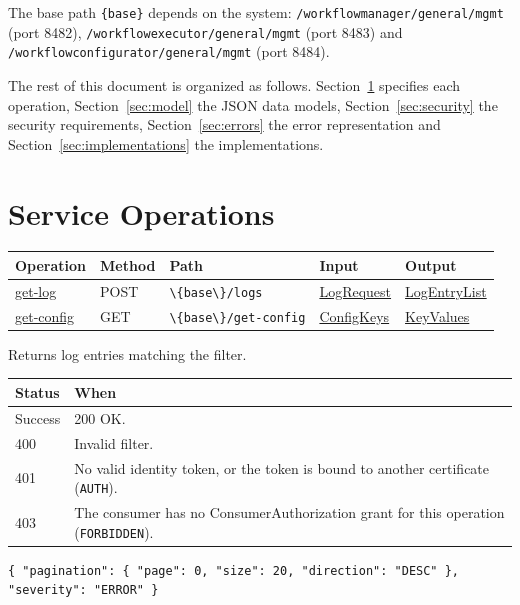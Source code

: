 \documentclass[a4paper]{arrowhead}
\newcommand{\mref}[1]{{\textcolor{ArrowheadPurple}{\hyperref[sec:model:#1]{#1}}}}
\newcommand{\oref}[1]{{\textcolor{ArrowheadBlue}{\hyperref[sec:operations:#1]{#1}}}}
\begin{document}
The base path \texttt{\{base\}} depends on the system: \texttt{/workflowmanager/general/mgmt} (port 8482),
\texttt{/workflowexecutor/general/mgmt} (port 8483) and \texttt{/workflowconfigurator/general/mgmt} (port 8484).

The rest of this document is organized as follows. Section~\ref{sec:operations} specifies each operation,
Section~\ref{sec:model} the JSON data models, Section~\ref{sec:security} the security requirements,
Section~\ref{sec:errors} the error representation and Section~\ref{sec:implementations} the implementations.

\newpage
\section{Service Operations}
\label{sec:operations}

{\small
\begin{longtable}{|p{3.0cm}|p{1.5cm}|p{5.3cm}|p{3.0cm}|p{3.0cm}|}

\hline
\rowcolor{gray!33} Operation & Method & Path & Input & Output \\ \hline
\endhead
\oref{get-log} & POST & \texttt{\textbackslash{}\{base\textbackslash{}\}/\allowbreak{}logs} & \mref{LogRequest} & \mref{LogEntryList} \\ \hline
\oref{get-config} & GET & \texttt{\textbackslash{}\{base\textbackslash{}\}/\allowbreak{}get-\allowbreak{}config} & \mref{ConfigKeys} & \mref{KeyValues} \\ \hline
\end{longtable}
}

Returns log entries matching the filter.

{\small
\begin{longtable}{|p{2.0cm}|p{13.8cm}|}

\hline
\rowcolor{gray!33} Status & When \\ \hline
\endhead
Success & 200 OK. \\ \hline
400 & Invalid filter. \\ \hline
401 & No valid identity token, or the token is bound to another certificate (\texttt{AUTH}). \\ \hline
403 & The consumer has no ConsumerAuthorization grant for this operation (\texttt{FORBIDDEN}). \\ \hline
\end{longtable}
}


\begin{lstlisting}[caption={Example request body}]
{ "pagination": { "page": 0, "size": 20, "direction": "DESC" }, "severity": "ERROR" }
\end{lstlisting}
\end{document}
